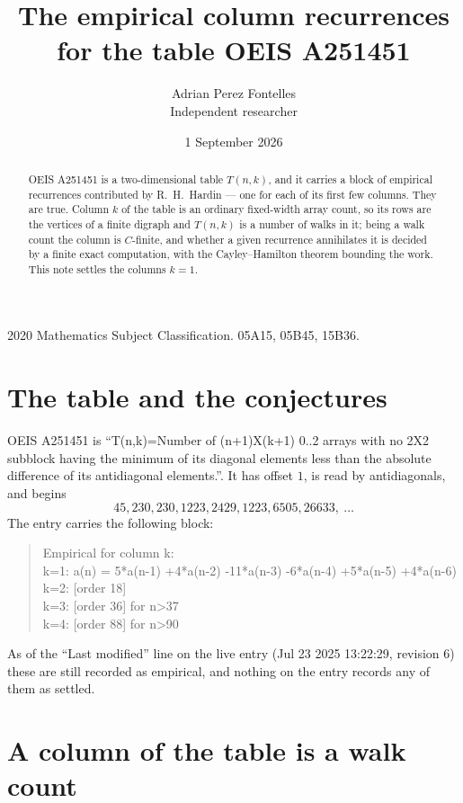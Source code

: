 \documentclass[11pt,a4paper]{article}
\title{The empirical column recurrences for the table OEIS A251451}
\author{Adrian Perez Fontelles\\ \small Independent researcher}
\date{1 September 2026}
\theoremstyle{plain}
\theoremstyle{definition}
\begin{document}
\maketitle

\begin{abstract}
OEIS A251451 is a two-dimensional table $T(n,k)$, and it carries a block of empirical
recurrences contributed by R.~H.~Hardin --- one for each of its first few columns. They are
true. Column $k$ of the table is an ordinary fixed-width array count, so its rows are the
vertices of a finite digraph and $T(n,k)$ is a number of walks in it; being a walk count the
column is $C$-finite, and whether a given recurrence annihilates it is decided by a finite
exact computation, with the Cayley--Hamilton theorem bounding the work. This note settles the columns $k=1$.
\end{abstract}

\noindent\small 2020 Mathematics Subject Classification. 05A15, 05B45, 15B36.\normalsize

\section{The table and the conjectures}

OEIS A251451 is ``T(n,k)=Number of (n+1)X(k+1) 0..2 arrays with no 2X2 subblock having the minimum of its diagonal elements less than the absolute difference of its antidiagonal elements.''. It has offset $1$, is
read by antidiagonals, and begins
\[
45, 230, 230, 1223, 2429, 1223, 6505, 26633,\ \dots
\]
The entry carries the following block:
\begin{quote}\small
Empirical for column k:\\
k=1: a(n) = 5*a(n-1) +4*a(n-2) -11*a(n-3) -6*a(n-4) +5*a(n-5) +4*a(n-6)\\
k=2: [order 18]\\
k=3: [order 36] for n>37\\
k=4: [order 88] for n>90\\
\end{quote}
As of the ``Last modified'' line on the live entry (Jul 23 2025 13:22:29, revision 6) these are still
recorded as empirical, and nothing on the entry records any of them as settled.

\section{A column of the table is a walk count}
\end{document}
